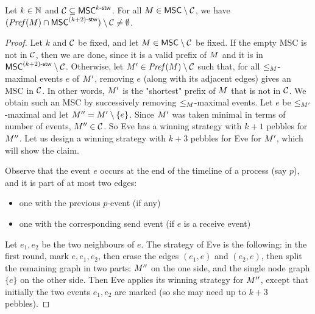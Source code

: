 \documentclass{article}
\begin{document}
\begin{lemma}\label{lem:pref_stw_k+2}
	Let $k \in \mathbb{N}$ and $\mathcal{C} \subseteq \mathsf{MSC}^{k\textup{-}\mathsf{stw}}$. For all
	$M \in \mathsf{MSC} \setminus \mathcal{C}$, we have
	$(\mathit{Pref}(M) \cap \mathsf{MSC}^{(k+2)\textup{-}\mathsf{stw}}) \setminus \mathcal{C} \neq \emptyset$.
\end{lemma}
\begin{proof}
	Let $k$ and $\mathcal{C}$ be fixed, and let
	$M\in \mathsf{MSC}\setminus \mathcal{C}$ be fixed. If the empty MSC is not in $\mathcal{C}$, then we are done, since it is a valid prefix of $M$ and it is in $\mathsf{MSC}^{(k+2)\textup{-}\mathsf{stw}} \setminus \mathcal{C}$.
	Otherwise, let $M'\in \mathit{Pref}(M) \setminus \mathcal{C}$ such that, for all $\le_M$-maximal events $e$ of $M'$, removing $e$ (along with its adjacent edges) gives an MSC in $\mathcal{C}$. In other words, $M'$ is the "shortest" prefix of $M$ that is not in $\mathcal{C}$. We obtain such an MSC by successively removing $\le_M$-maximal events. Let $e$ be $\le_{M'}$-maximal and let $M''=M' \setminus \{e\}$. Since $M'$ was taken minimal in terms of number of events,	$M''\in \mathcal{C}$.
	So Eve has a winning strategy with $k+1$ pebbles for $M''$.
	Let us design a winning strategy with $k+3$ pebbles for Eve for $M'$, which will show the claim.

	Observe that the event $e$ occurs at the end of the timeline of a process (say $p$), and it is part of at most two edges:
	\begin{itemize}
		\item one with the previous $p$-event (if any)
		\item one with the corresponding send event (if $e$ is a receive event)
	\end{itemize}
	Let $e_1,e_2$ be the two neighbours of $e$.
	The strategy of Eve is the following: in the first round, mark $e,e_1,e_2$,
	then erase the edges $(e_1,e)$ and $(e_2,e)$, then split the remaining graph
	in two parts: $M''$ on the one side, and the single node graph $\{e\}$ on
	the other side. Then Eve applies its winning strategy for $M''$, except
	that initially the two events $e_1,e_2$ are marked (so she may need up to $k+3$
	pebbles).
\end{proof}
\end{document}
